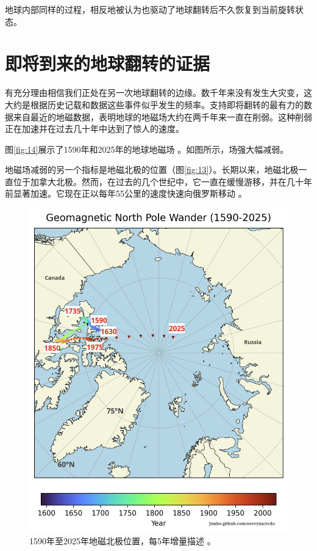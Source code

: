 \documentclass[10pt,twocolumn,letterpaper]{article}
\begin{document}
地球内部同样的过程，相反地被认为也驱动了地球翻转后不久恢复到当前旋转状态。

\section{即将到来的地球翻转的证据}

有充分理由相信我们正处在另一次地球翻转的边缘。数千年来没有发生大灾变，这大约是根据历史记载和数据这些事件似乎发生的频率。支持即将翻转的最有力的数据来自最近的地磁数据，表明地球的地磁场大约在两千年来一直在削弱。这种削弱正在加速并在过去几十年中达到了惊人的速度。

图\ref{fig:14}展示了1590年和2025年的地球地磁场 \cite{125,126}。如图所示，场强大幅减弱。

地磁场减弱的另一个指标是地磁北极的位置（图\ref{fig:13}）。长期以来，地磁北极一直位于加拿大北极。然而，在过去的几个世纪中，它一直在缓慢游移，并在几十年前显著加速。它现在正以每年55公里的速度快速向俄罗斯移动 \cite{124}。

\begin{figure}[t]
\begin{center}
   \includegraphics[width=1\linewidth]{npw.jpg}
\end{center}
   \caption{1590年至2025年地磁北极位置，每5年增量描述 \cite{142}。}
\label{fig:13}
\label{fig:onecol}
\end{figure}
\end{document}

